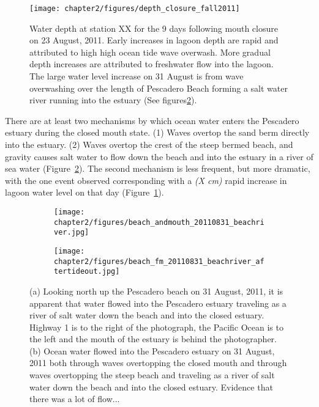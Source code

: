 \begin{figure}
\centering
		\texttt{[image: chapter2/figures/depth\_closure\_fall2011]} \caption{Water depth at station XX for the 9 days following mouth closure on 23 August, 2011. Early increases in lagoon depth are rapid and attributed to high high ocean tide wave overwash. More gradual depth increases are attributed to freshwater flow into the lagoon. The large water level increase on 31 August is from wave overwashing over the length of Pescadero Beach forming a salt water river running into the estuary (See figures\ref{fig:beachriver}).}
	\label{fig:depthclosuref11} 
\end{figure}


There are at least two mechanisms by which ocean water enters the Pescadero estuary during the closed mouth state. (1) Waves overtop the sand berm directly into the estuary. (2) Waves overtop the crest of the steep bermed beach, and gravity causes salt water to flow down the beach and into the estuary in a river of sea water (Figure~\ref{fig:beachriver}). The second mechanism is less frequent, but more dramatic, with the one event observed corresponding with a \emph{(X cm)} rapid increase in lagoon water level on that day (Figure~\ref{fig:depthclosuref11}).

\begin{figure}
\begin{subfigure}{.5\textwidth}
		\texttt{[image: chapter2/figures/beach\_andmouth\_20110831\_beachriver.jpg]}
\end{subfigure}
\begin{subfigure}{.5\textwidth}
		\texttt{[image: chapter2/figures/beach\_fm\_20110831\_beachriver\_aftertideout.jpg]}
\end{subfigure}   \caption{(a) Looking north up the Pescadero beach on 31 August, 2011, it is apparent that water flowed into the Pescadero estuary traveling as a river of salt water down the beach and into the closed estuary. Highway 1 is to the right of the photograph, the Pacific Ocean is to the left and the mouth of the estuary is behind the photographer. (b) Ocean water flowed into the Pescadero estuary on 31 August, 2011 both through waves overtopping the closed mouth and through waves overtopping the steep beach and traveling as a river of salt water down the beach and into the closed estuary. Evidence that there was a lot of flow...} 		 \label{fig:beachriver} 
 \end{figure}

